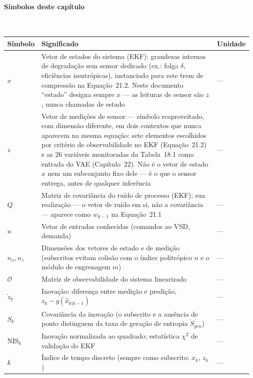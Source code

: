 \documentclass[12pt,a4paper]{article}
\numberwithin{equation}{section}
\numberwithin{table}{section}
\numberwithin{figure}{section}
\begin{document}
\paragraph{Símbolos deste capítulo}\mbox{}\\[-0.5em]
{\small
\begin{longtable}{>{\raggedright\arraybackslash}p{2.6cm} >{\raggedright\arraybackslash}p{9.2cm} >{\raggedright\arraybackslash}p{2.6cm}}
	\toprule
	\textbf{Símbolo} & \textbf{Significado} & \textbf{Unidade} \\ \midrule
	\endhead
	$x$ & Vetor de estados do sistema (EKF): grandezas internas de degradação sem sensor dedicado (ex.: folga $\delta$, eficiências isentrópicas), instanciado para este trem de compressão na Equação~21.2. Neste documento ``estado'' designa sempre $x$ — as leituras de sensor são $z$, nunca chamadas de estado & --- \\
	$z$ & Vetor de medições de sensor — símbolo reaproveitado, com dimensão diferente, em dois contextos que nunca aparecem na mesma equação: sete elementos escolhidos por critério de observabilidade no EKF (Equação~21.2) e as 26 variáveis monitoradas da Tabela~18.1 como entrada do VAE (Capítulo~22). Não é o vetor de estado $x$ nem um subconjunto fixo dele — é o que o sensor entrega, antes de qualquer inferência & --- \\
	$Q$ & Matriz de covariância do ruído de processo (EKF); sua realização — o vetor de ruído em si, não a covariância — aparece como $w_{k-1}$ na Equação~21.1 & --- \\
	$u$ & Vetor de entradas conhecidas (comandos ao VSD, demanda) & --- \\
	$n_x, n_z$\dag & Dimensões dos vetores de estado e de medição (subscritos evitam colisão com o índice politrópico $n$ e o módulo de engrenagem $m$) & --- \\
	$\mathcal{O}$ & Matriz de observabilidade do sistema linearizado & --- \\
	$\tilde{z}_k$ & Inovação: diferença entre medição e predição, $z_k - g(\hat{x}_{k|k-1})$ & --- \\
	$S_k$\dag & Covariância da inovação (o subscrito e a ausência de ponto distinguem da taxa de geração de entropia $\dot{S}_{gen}$) & --- \\
	$\text{NIS}_k$ & Inovação normalizada ao quadrado; estatística $\chi^2$ de validação do EKF & --- \\
	$k$ & Índice de tempo discreto (sempre como subscrito: $x_k$, $z_k$) & --- \\
	\bottomrule
\end{longtable}
}
\end{document}
